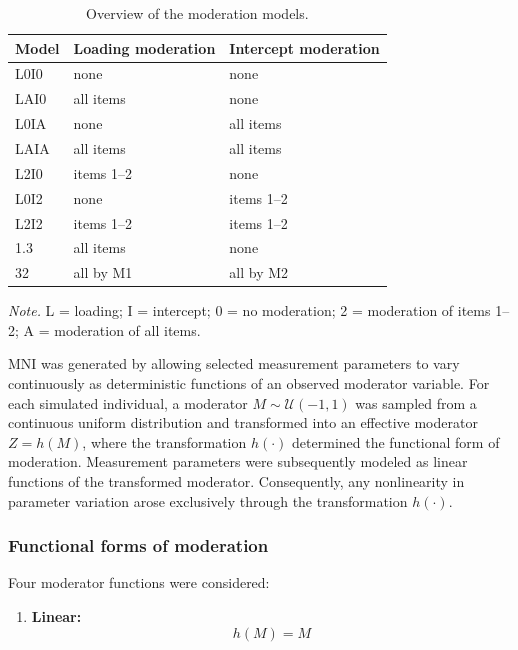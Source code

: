 \documentclass[
  man,
  floatsintext]{apa7}
\providecommand{\tightlist}{%
  \setlength{\itemsep}{0pt}\setlength{\parskip}{0pt}}
\begin{document}
\begin{table}[ht]
\centering
\begin{threeparttable}
\caption{Overview of the moderation models.}

\begin{tabular}{lll}
\toprule
Model & Loading moderation & Intercept moderation\\
\midrule
L0I0 & none & none\\
LAI0 & all items & none\\
L0IA & none & all items\\
LAIA & all items & all items\\
L2I0 & items 1--2 & none\\
\addlinespace
L0I2 & none & items 1--2\\
L2I2 & items 1--2 & items 1--2\\
1.3 & all items & none\\
32 & all by M1 & all by M2\\
\bottomrule
\end{tabular}
\begin{tablenotes}[flushleft]
\footnotesize
\item \textit{Note.} L = loading; I = intercept; 0 = no moderation; 2 = moderation of items 1--2; A = moderation of all items.
\end{tablenotes}
\end{threeparttable}
\end{table}

MNI was generated by allowing selected measurement parameters to vary
continuously as deterministic functions of an observed moderator
variable. For each simulated individual, a moderator
\(M \sim \mathcal U(-1,1)\) was sampled from a continuous uniform
distribution and transformed into an effective moderator\(Z = h(M)\),
where the transformation \(h(\cdot)\) determined the functional form of
moderation. Measurement parameters were subsequently modeled as linear
functions of the transformed moderator. Consequently, any nonlinearity
in parameter variation arose exclusively through the transformation
\(h(\cdot)\).

\subsubsection{Functional forms of
moderation}\label{functional-forms-of-moderation}

Four moderator functions were considered:

\begin{enumerate}
\def\labelenumi{\arabic{enumi}.}
\tightlist
\item
  \textbf{Linear:} \[
  h(M) = M
  \]
\end{enumerate}
\end{document}
